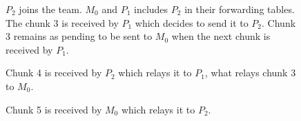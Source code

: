 \begin{figure}
  \caption{$P_2$ joins the team. $M_0$ and $P_1$ includes $P_2$ in
    their forwarding tables. The chunk 3 is received by $P_1$ which
    decides to send it to $P_2$. Chunk 3 remains as pending to be sent
    to $M_0$ when the next chunk is received by
    $P_1$.} %
  \label{fig:team_2}
\end{figure}
    
\begin{figure}
  \caption{Chunk 4 is received by $P_2$ which relays it to $P_1$, what
    relays chunk 3 to $M_0$.} %
  \label{fig:team_3}
\end{figure}

\begin{figure}
  \caption{Chunk 5 is received by $M_0$ which
    relays it to $P_2$.} %
  \label{fig:team_4}
\end{figure}

\begin{notex}
  \begin{figure*}
  \end{figure*}
  
  \begin{figure*}
  \end{figure*}
  
  \begin{figure*}
  \end{figure*}
  
  \begin{figure*}
  \end{figure*}
  
  \begin{figure*}
  \end{figure*}
  
  \begin{figure*}
  \end{figure*}
  
  \begin{figure*}
  \end{figure*}
  
  \begin{figure*}
  \end{figure*}
  
  \begin{figure*}
  \end{figure*}

\end{notex}

